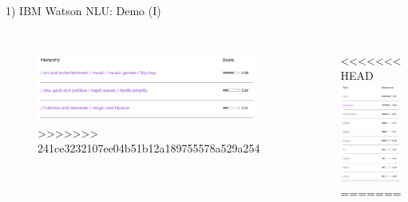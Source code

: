 \documentclass[xcolor=dvipsnames]{beamer}
\begin{document}
\begin{frame}{1) IBM Watson NLU: Demo (I)}
\begin{columns}
\begin{figure}
	\includegraphics[scale=0.3]{./images/categories}
>>>>>>> 241ce3232107ee04b51b12a189755578a529a254
\end{figure}
\begin{figure}
<<<<<<< HEAD
	\includegraphics[scale=0.25,left]{./images/keywords}
=======

\end{figure}
\end{columns}
\end{frame}
\end{document}
